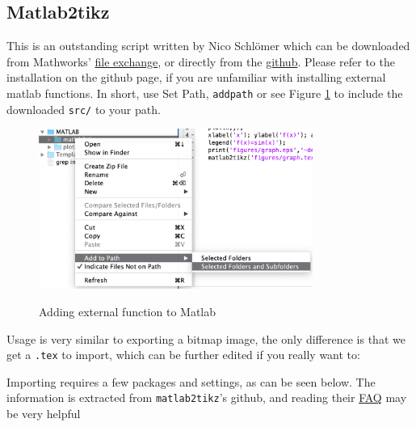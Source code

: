 \subsection{Matlab2tikz}
This is an outstanding script written by Nico Schlömer which can be downloaded from Mathworks' \href{https://uk.mathworks.com/matlabcentral/fileexchange/22022-matlab2tikz-matlab2tikz}{file exchange}, or directly from the \href{https://github.com/matlab2tikz/matlab2tikz}{github}. Please refer to the installation on the github page, if you are unfamiliar with installing external matlab functions.
In short, use Set Path, \verb|addpath| or see Figure \ref{fig:setpath} to include the downloaded \verb|src/| to your path.
\begin{figure}[h]
\centering
    \includegraphics[width=0.8\textwidth]{figures/setpath.png}
\label{fig:setpath}
\caption{Adding external function to Matlab}
\end{figure}

Usage is very similar to exporting a bitmap image, the only difference is that we get a \texttt{.tex} to import, which can be further edited if you really want to:


Importing requires a few packages and settings, as can be seen below.
The information is extracted from \texttt{matlab2tikz}'s github, and reading their \href{https://github.com/matlab2tikz/matlab2tikz/wiki/FAQ}{FAQ} may be very helpful 


